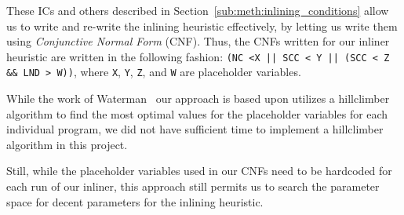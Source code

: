 These ICs and others described in Section~\ref{sub:meth:inlining_conditions}
allow us to write and re-write the inlining heuristic effectively, by letting us
write them using \textit{Conjunctive Normal Form} (CNF). Thus, the CNFs written
for our inliner heuristic are written in the following fashion:
\lstinline"(NC <X || SCC < Y || (SCC < Z && LND > W))", where \lstinline!X!,
\lstinline!Y!, \lstinline!Z!, and \lstinline!W! are placeholder variables.

While the work of Waterman~\cite{AdaptvCompilAndInlingWaterman} our approach is
based upon utilizes a hillclimber algorithm to find the most optimal values for
the placeholder variables for each individual program, we did not have
sufficient time to implement a hillclimber algorithm in this project.

Still, while the placeholder variables used in our CNFs need to be hardcoded for
each run of our inliner, this approach still permits us to search the parameter
space for decent parameters for the inlining heuristic.
